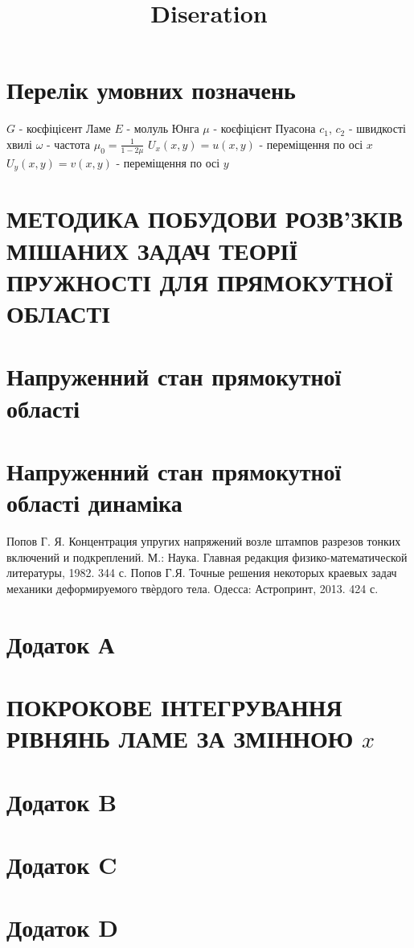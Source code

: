 \documentclass[a4paper,10pt]{extarticle}
\title{Diseration}
\author{}
\date{}
\numberwithin{equation}{section}
\begin{document}
\newpage

\renewcommand{\contentsname}{\centering Зміст}
\tableofcontents

\newpage

\section*{\centering Перелік умовних позначень}
$G$ - коєфіцієент Ламе \newline
$E$ - молуль Юнга \newline
$\mu$ - коєфіцієнт Пуасона \newline
$c_1$, $c_2$ - швидкості хвилі \newline
$\omega$ - частота \newline
$\mu_0 = \frac{1}{1 - 2\mu}$ \newline
$U_x(x,y) = u(x,y)$ - переміщення по осі $x$ \newline
$U_y(x,y) = v(x,y)$ - переміщення по осі $y$

\section{МЕТОДИКА ПОБУДОВИ РОЗВ’ЗКІВ МІШАНИХ ЗАДАЧ
ТЕОРІЇ ПРУЖНОСТІ ДЛЯ ПРЯМОКУТНОЇ ОБЛАСТІ}


\section{Напруженний стан прямокутної області}


\section{Напруженний стан прямокутної області динаміка}


\begin{thebibliography}{1}
    Попов Г. Я. Концентрация упругих напряжений возле штампов разрезов тонких включений и подкреплений. М.: Наука. Главная редакция физико-математической литературы, 1982. 344 с.
    Попов Г.Я. Точные решения некоторых краевых задач механики деформируемого твѐрдого тела. Одесса: Астропринт, 2013. 424 с.

\end{thebibliography}

\section*{\centering Додаток А}\label{ap_A}
\section*{\centering ПОКРОКОВЕ ІНТЕГРУВАННЯ РІВНЯНЬ ЛАМЕ ЗА ЗМІННОЮ $x$}


\section*{\centering Додаток B}\label{ap_B}


\section*{Додаток C}\label{ap_C}


\section*{Додаток D}\label{ap_d}

\end{document}
